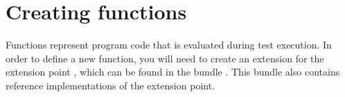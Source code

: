 \chapter{Creating \app{} functions}
\label{functions}

Functions represent program code that is evaluated during test execution.
In order to define a new \app{} function, you will need to create an extension
for the extension point , which
can be found in the bundle . This
bundle also contains reference implementations of the extension point.
